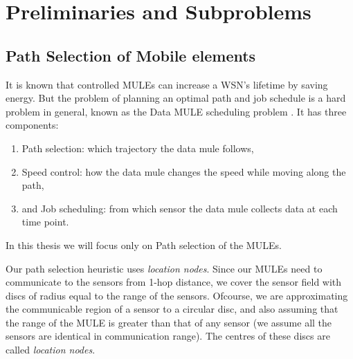 \chapter{Preliminaries and Subproblems}
\label{chap:location_nodes}

\section{Path Selection of Mobile elements}
It is known that controlled MULEs can increase a WSN's lifetime by saving energy. But the problem of planning an optimal path and job schedule is a hard problem in general, known as the Data MULE scheduling problem \cite{dms}. It has three components:
\begin{enumerate}
\item Path selection: which trajectory the data mule follows,
\item Speed control: how the data mule changes the speed while moving along the path,
\item and Job scheduling: from which sensor the data mule collects data at each time point.
\end{enumerate}
In this thesis we will focus only on Path selection of the MULEs.

Our path selection heuristic uses \emph{location nodes}. Since our MULEs need to communicate to  the sensors from 1-hop distance, we cover the sensor field with discs of radius equal to the range of the sensors. Ofcourse, we are approximating the communicable region of a sensor to a circular disc, and also assuming that the range of the MULE is greater than that of any sensor (we assume all the sensors are identical in communication range). The centres of these discs are called \emph{location nodes}.

